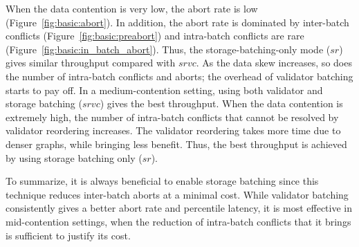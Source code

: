 When the data contention is very low, the abort rate is low (Figure~\ref{fig:basic:abort}). In addition, the abort rate is dominated by inter-batch conflicts (Figure~\ref{fig:basic:preabort}) and intra-batch conflicts are rare (Figure~\ref{fig:basic:in_batch_abort}). Thus, the storage-batching-only mode ($sr$) gives similar throughput compared with $srvc$.  As the data skew increases, so does the number of intra-batch conflicts and aborts; the overhead of validator batching starts to pay off. In a medium-contention setting, using both validator and storage batching ($srvc$) gives the best throughput. When the data contention is extremely high, the number of intra-batch conflicts that cannot be resolved by validator reordering increases. The validator reordering takes more time due to denser graphs, while bringing less benefit. Thus, the best throughput is achieved by using storage batching only ($sr$). 

To summarize, it is always beneficial to enable storage batching since this technique reduces inter-batch aborts at a minimal cost. While validator batching consistently gives a better abort rate and percentile latency, it is most effective in mid-contention settings, when the reduction of intra-batch conflicts that it brings is sufficient to justify its cost. 
